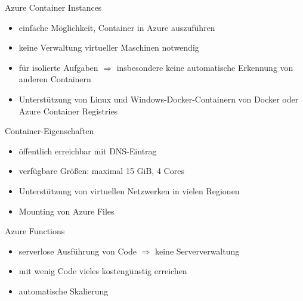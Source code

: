 \begin{flashcard}[]{Azure Container Instances}
  \begin{itemize}
    \item einfache Möglichkeit, Container in Azure auszuführen
    \item keine Verwaltung virtueller Maschinen notwendig
    \item für isolierte Aufgaben\newline
      $\Rightarrow$ insbesondere keine automatische Erkennung von anderen Containern
    \item Unterstützung von Linux und Windows-Docker-Containern von Docker oder Azure Container Registries
  \end{itemize}
\end{flashcard}

\begin{flashcard}[]{Container-Eigenschaften}
  \begin{itemize}
    \item öffentlich erreichbar mit DNS-Eintrag
    \item verfügbare Größen: maximal 15 GiB, 4 Cores
    \item Unterstützung von virtuellen Netzwerken in vielen Regionen
    \item Mounting von Azure Files
  \end{itemize}
\end{flashcard}

\begin{flashcard}[]{Azure Functions}
  \begin{itemize}
    \item serverlose Ausführung von Code\newline
      $\Rightarrow$ keine Serververwaltung
    \item mit wenig Code vieles kostengünstig erreichen
    \item automatische Skalierung
  \end{itemize}
\end{flashcard}

